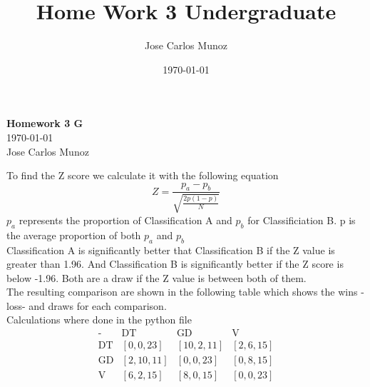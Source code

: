 \documentclass[12pt,english]{article}
\title{Home Work 3 Undergraduate}
\date{\today}
\author{Jose Carlos Munoz}
\begin{document}
\begin{center}
    \Large
    \textbf{Homework 3 G}\\
    \small
    \today\\
    \large
    Jose Carlos Munoz
\end{center}%
To find the Z score we calculate it with the following equation
\begin{equation}\tag{1}\label{eq:1}
Z = \frac{p_a - p_b}{\sqrt{\frac{2p(1-p)}{N}}}
\end{equation}
$p_a$ represents the proportion of Classification A and $p_b$ for Classificiation B. p is the average proportion of both $p_a$ and $p_b$\\
Classification A is significantly better that Classification B if the Z value is greater than 1.96. And Classification B is significantly better if the Z score is below -1.96. Both are a draw if the Z value is between both of them.\\
The resulting comparison are shown in the following table which shows the wins - loss- and draws for each comparison.\\
Calculations where done in the python file
\begin{equation}
\begin{array}{c|ccc}
\mbox{-}& \mbox{DT} & \mbox{GD} & \mbox{V}\\
\hline
\mbox{DT} & \left[ 0,0,23 \right]& \left[ 10,2,11\right]& \left[ 2,6,15 \right]\\
\mbox{GD} & \left[ 2,10,11\right]& \left[ 0,0,23 \right]& \left[ 0,8,15 \right]\\
\mbox{V}  & \left[ 6,2,15 \right]& \left[ 8,0,15 \right]& \left[ 0,0,23 \right]
\end{array}
\end{equation}
\end{document}
